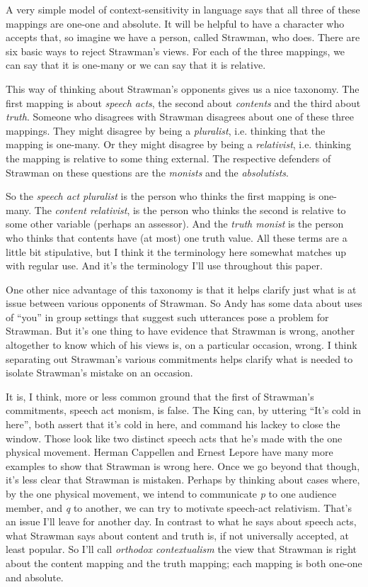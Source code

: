 \noindent A very simple model of context-sensitivity in language says that all three of these mappings are one-one and absolute. It will be helpful to have a character who accepts that, so imagine we have a person, called Strawman, who does. There are six basic ways to reject Strawman's views. For each of the three mappings, we can say that it is one-many or we can say that it is relative.

This way of thinking about Strawman's opponents gives us a nice taxonomy. The first mapping is about \textit{speech acts}, the second about \textit{contents} and the third about \textit{truth}. Someone who disagrees with Strawman disagrees about one of these three mappings. They might disagree by being a \textit{pluralist}, i.e. thinking that the mapping is one-many. Or they might disagree by being a \textit{relativist}, i.e. thinking the mapping is relative to some thing external. The respective defenders of Strawman on these questions are the \textit{monists} and the \textit{absolutists}.

So the \textit{speech act pluralist} is the person who thinks the first mapping is one-many. The \textit{content relativist}, is the person who thinks the second is relative to some other variable (perhaps an assessor). And the \textit{truth monist} is the person who thinks that contents have (at most) one truth value. All these terms are a little bit stipulative, but I think it the terminology here somewhat matches up with regular use. And it's the terminology I'll use throughout this paper.

One other nice advantage of this taxonomy is that it helps clarify just what is at issue between various opponents of Strawman. So Andy \citet{Egan2009-EGABBA} has some data about uses of ``you'' in group settings that suggest such utterances pose a problem for Strawman. But it's one thing to have evidence that Strawman is wrong, another altogether to know which of his views is, on a particular occasion, wrong. I think separating out Strawman's various commitments helps clarify what is needed to isolate Strawman's mistake on an occasion.

It is, I think, more or less common ground that the first of Strawman's commitments, speech act monism, is false. The King can, by uttering ``It's cold in here'', both assert that it's cold in here, and command his lackey to close the window. Those look like two distinct speech acts that he's made with the one physical movement. Herman Cappellen and Ernest Lepore \citep{Cappelen2005} have many more examples to show that Strawman is wrong here. Once we go beyond that though, it's less clear that Strawman is mistaken. Perhaps by thinking about cases where, by the one physical movement, we intend to communicate \textit{p} to one audience member, and \textit{q} to another, we can try to motivate speech-act relativism. That's an issue I'll leave for another day. In contrast to what he says about speech acts, what Strawman says about content and truth is, if not universally accepted, at least popular. So I'll call \textit{orthodox contextualism} the view that Strawman is right about the content mapping and the truth mapping; each mapping is both one-one and absolute. 

